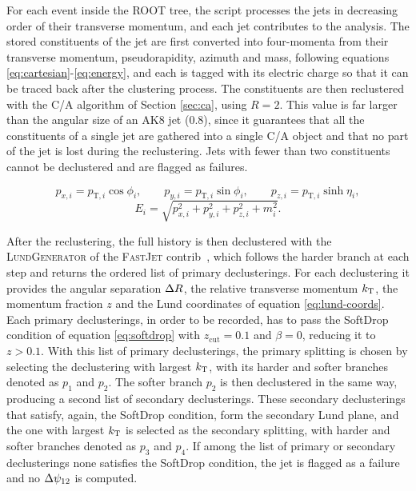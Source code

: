 For each event inside the ROOT tree, the script processes the jets in decreasing order of their
transverse momentum, and each jet contributes to the analysis. The stored constituents of the
jet are first converted into four-momenta from their transverse momentum, pseudorapidity, azimuth and mass, following equations \ref{eq:cartesian}-\ref{eq:energy},
and each is tagged with its electric charge so that it can be traced back after the clustering process.
The constituents are then reclustered with the C/A algorithm of Section \ref{sec:ca}, using 
$R=2$. This value is far larger than the angular size of an AK8 jet ($0.8$), since it
guarantees that all the constituents of a single \antikt{} jet are gathered into a single C/A
object and that no part of the jet is lost during the reclustering. 
Jets with fewer than two constituents cannot be
declustered and are flagged as failures.

\begin{equation}
  p_{x,i} = p_{\mathrm{T},i}\cos\phi_i, \qquad
  p_{y,i} = p_{\mathrm{T},i}\sin\phi_i, \qquad
  p_{z,i} = p_{\mathrm{T},i}\sinh\eta_i,
  \label{eq:cartesian}
\end{equation}
%
\begin{equation}
  E_i = \sqrt{p_{x,i}^2 + p_{y,i}^2 + p_{z,i}^2 + m_i^2} .
  \label{eq:energy}
\end{equation}

After the reclustering, the full history is then declustered with the \textsc{LundGenerator}
of the \textsc{FastJet} contrib~\cite{Dreyer:2018nbf}, which follows the harder branch at each step
and returns the ordered list of primary declusterings. For
each declustering it provides the angular separation $\Delta R$, the relative
transverse momentum $k_{\mathrm{T}}$, the momentum fraction $z$ and the Lund coordinates of
equation \eqref{eq:lund-coords}. Each primary declusterings, in order to be recorded, has to pass the 
SoftDrop condition of equation \ref{eq:softdrop} with $z_{\text{cut}} = 0.1$ and $\beta = 0$,
reducing it to $z > 0.1$. With this list of primary declusterings, the primary splitting is
chosen by selecting the declustering with largest $k_{\mathrm{T}}$, with its harder and softer branches
denoted as $p_1$ and $p_2$. The softer branch $p_2$ is then declustered in the same way,
producing a second list of secondary declusterings. These secondary declusterings that satisfy, again,
the SoftDrop condition, form the secondary Lund plane, and the one with largest $k_{\mathrm{T}}$ is selected
as the secondary splitting, with harder and softer branches denoted as $p_3$ and $p_4$. If among
the list of primary or secondary declusterings none satisfies the SoftDrop condition, the jet
is flagged as a failure and no $\Delta\psi_{12}$ is computed.

